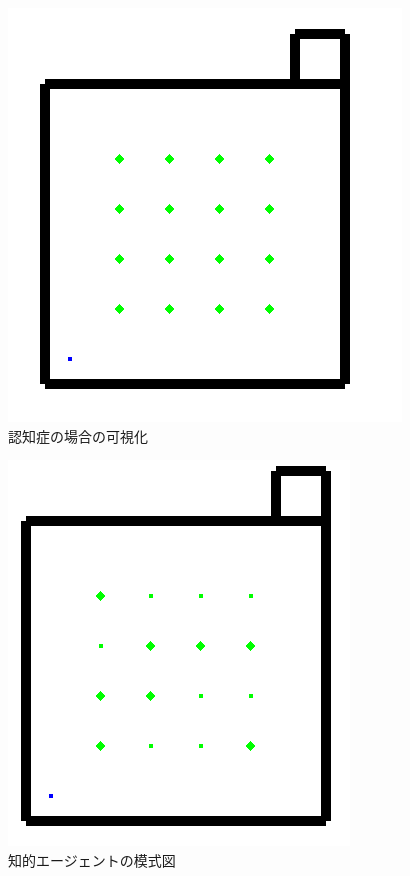 \begin{figure}[htb]
\begin{center}
 \includegraphics[scale=0.6]{figures/elderly_v3.png}
 \caption[認知症の場合の可視化]{認知症の場合の可視化 \label{elderly_v3}}
\end{center}
\end{figure}


\begin{figure}[htb]
\begin{center}
 \includegraphics[scale=0.6]{figures/health_urinate.png}
 \caption[知的エージェントの模式図]{知的エージェントの模式図 \label{health_urinate}}
\end{center}
\end{figure}

